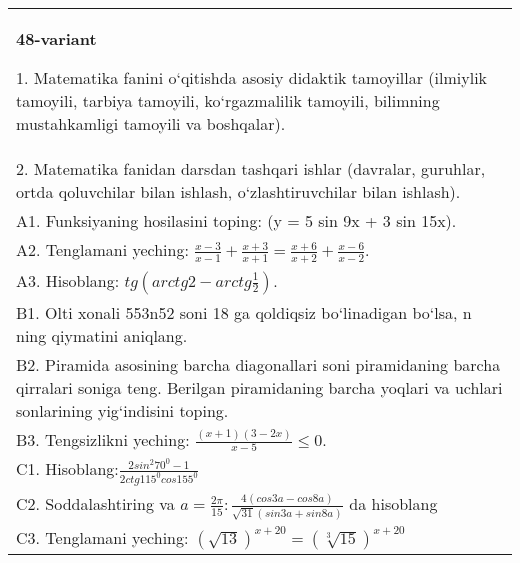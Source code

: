 \documentclass{article}
\begin{document}
\begin{tabular}{m{17cm}}
\textbf{48-variant}

1. Matematika fanini o‘qitishda asosiy didaktik tamoyillar (ilmiylik tamoyili, tarbiya tamoyili, ko‘rgazmalilik tamoyili, bilimning mustahkamligi tamoyili va boshqalar). \\
2. Matematika fanidan darsdan tashqari ishlar (davralar, guruhlar, ortda qoluvchilar bilan ishlash, o‘zlashtiruvchilar bilan ishlash). \\
A1. Funksiyaning hosilasini toping: (y = 5 sin 9x + 3 sin 15x). \\
A2. Tenglamani yeching: \(\frac{x - 3}{x - 1} + \frac{x + 3}{x + 1} = \frac{x + 6}{x + 2} + \frac{x - 6}{x - 2}\). \\
A3. Hisoblang: \(tg\left(arctg2 - arctg\frac{1}{2} \right) \). \\
B1. Olti xonali 553n52 soni 18 ga qoldiqsiz bo‘linadigan bo‘lsa, n ning qiymatini aniqlang. \\
B2. Piramida asosining barcha diagonallari soni piramidaning barcha qirralari soniga teng. Berilgan piramidaning barcha yoqlari va uchlari sonlarining yig‘indisini toping. \\
B3. Tengsizlikni yeching: \(\frac{ (x + 1) (3 - 2x) }{x - 5} \leq 0\). \\
C1. Hisoblang:\(\frac{2sin^{2}70^{0} - 1}{2ctg115^{0}cos155^{0}}\) \\
C2. Soddalashtiring va \(a = \frac{2\pi}{15}:\frac{4 (cos3a - cos8a) }{\sqrt{31} (sin3a + sin8a) }\) da hisoblang \\
C3. Tenglamani yeching: \((\sqrt{13}) ^{x + 20} = (\sqrt[3]{15}) ^{x + 20}\) \\

\end{tabular}
\vspace{1cm}
\end{document}
